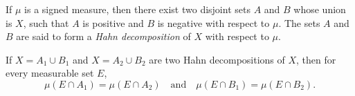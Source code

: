 If $\mu$ is a signed measure, then there exist two disjoint sets $A$ and $B$ whose union is $X$, such that $A$ is positive and $B$ is negative with respect to $\mu$. The sets $A$ and $B$ are said to form a \textit{Hahn decomposition} of $X$ with respect to $\mu$.

If $X = A_1 \cup B_1$ and $X = A_2 \cup B_2$ are two Hahn decompositions of $X$, then for every measurable set $E$,
$$\mu(E \cap A_1) = \mu(E \cap A_2) \quad \text{and} \quad \mu(E \cap B_1) = \mu(E \cap B_2).$$
